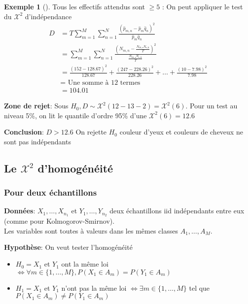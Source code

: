 \documentclass{article}
\theoremstyle{plain}%
\theoremstyle{definition}
\newtheorem{exmp}{Exemple}[section]
\theoremstyle{remark}
\begin{document}
\begin{exmp}[]
    Tous les effectifs attendus sont $ \geq 5 $ : On peut appliquer le test du $ \mathcal{X}^2 $ d'indépendance
    \begin{align*}
        D &= T \sum_{m=1}^{M}\sum_{n=1}^{N} \frac{(\hat{p}_{m,n} - \hat{p}_m \hat{q}_n)^2}{\hat{p}_m \hat{q}_n} \\
            &= \sum_{m=1}^{M}\sum_{n=1}^{N} \frac{(N_{m,n} - \frac{N_{m,\centerdot} N_{\centerdot, n}}{T})^2}{\frac{N_{m,\centerdot} N_{\centerdot, n}}{T}} \\
            &= \frac{(152 - 128.67)^2}{128.67} + \frac{(247 - 228.26)^2}{228.26} + \dots + \frac{(10 - 7.98)^2}{7.98} \\
            &= \text{ Une somme à 12 termes} \\
            &= 104.01
    \end{align*}

    \textbf{Zone de rejet}: Sous $ H_0, D \sim \mathcal{X}^2 (12 -1 3 - 2) = \mathcal{X}^2 (6)$. Pour un test au niveau 5\%, on lit le quantile d'ordre 95\% d'une $ \mathcal{X}^2(6) = 12.6 $ 

    \textbf{Conclusion}: $ D>12.6 $ On rejette $ H_0 $ couleur d'yeux et couleurs de cheveux ne sont pas indépendants
\end{exmp}


\subsection{Le $ \mathcal{X}^2 $ d'homogénéité}
\subsubsection{Pour deux échantillons}

\textbf{Données}: $ X_1, \dots, X_{n_1} $ et $ Y_1, \dots, Y_{n_2} $ deux échantillons iid indépendants entre eux (comme pour Kolmogorov-Smirnov). \\
Les variables sont toutes à valeurs dans les mêmes classes $ A_1, \dots, A_M $.

\textbf{Hypothèse}: On veut tester l'homogénéité \begin{itemize}
    \item $ H_0 = X_1$ et $ Y_1 $  ont la même loi $ \Leftrightarrow \forall m \in \{1,\dots,M \}, P(X_1 \in A_m) = P(Y_1 \in A_m) $ 
    \item $ H_1 = X_1$ et $ Y_1 $  n'ont pas la même loi $ \Leftrightarrow \exists m \in \{1, \dots, M\} $ tel que $ P(X_1 \in A_m) \neq P(Y_1 \in A_m) $ 
\end{itemize}
\end{document}

